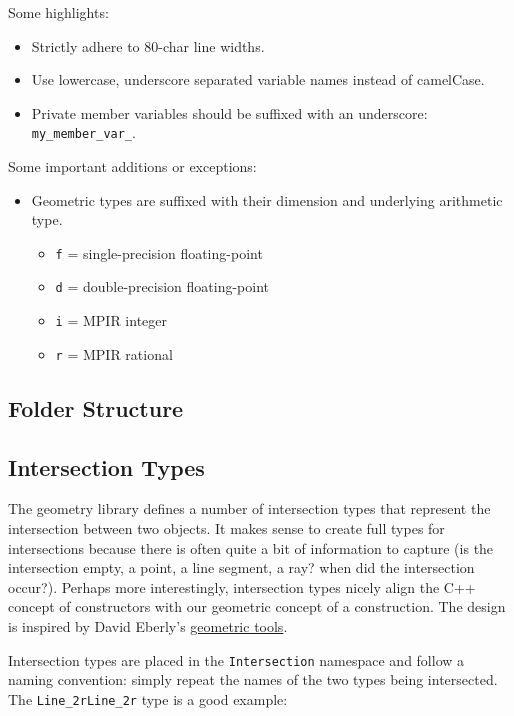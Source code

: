 Some highlights:

\begin{itemize}
  \item Strictly adhere to 80-char line widths.
  \item Use lowercase, underscore separated variable names instead of
  camelCase.
  \item Private member variables should be suffixed with an underscore:
  \texttt{my\_member\_var\_}.
\end{itemize}

Some important additions or exceptions:

\begin{itemize}
  \item Geometric types are suffixed with their dimension and underlying
  arithmetic type.
  \begin{itemize}
    \item \texttt{f} = single-precision floating-point
    \item \texttt{d} = double-precision floating-point
    \item \texttt{i} = MPIR integer
    \item \texttt{r} = MPIR rational
  \end{itemize}
\end{itemize}
  

\subsection{Folder Structure}\label{appdx:folder-structure}

\subsection{Intersection Types}\label{appdx:intersection-types}

The geometry library defines a number of intersection types that represent the
intersection between two objects. It makes sense to create full types for
intersections because there is often quite a bit of information to capture (is
the intersection empty, a point, a line segment, a ray? when did the
intersection occur?). Perhaps more interestingly, intersection types nicely
align the C++ concept of constructors with our geometric concept of a
construction. The design is inspired by David Eberly's
\href{http://www.geometrictools.com/Source/Intersection2D.html}{geometric tools}.

Intersection types are placed in the \texttt{Intersection} namespace and follow
a naming convention: simply repeat the names of the two types being intersected.
The \texttt{Line\_2rLine\_2r} type is a good example:

